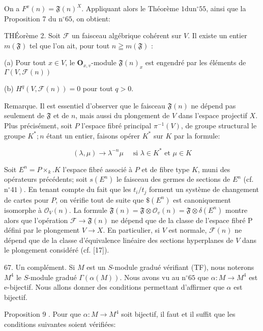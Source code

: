 On a $F^{x}(n)=\mathfrak{F}(n)^{X}$. Appliquant alors le Théorème $1 \mathrm{du} \mathrm{n}^{\circ} 55$, ainsi que la Proposition 7 du $\mathrm{n}^{\circ} 65$, on obtient:

THÉorème 2. Soit $\mathcal{F}$ un faisceau algébrique cohérent sur $V$. Il existe un entier $m(\mathfrak{F})$ tel que l'on ait, pour tout $n \geqq m(\mathfrak{F})$ :

(a) Pour tout $x \in V$, le $\boldsymbol{O}_{x, v}$-module $\mathfrak{F}(n)_{x}$ est engendré par les éléments de $\Gamma(V, \mathcal{F}(n))$

(b) $H^{q}(V, \mathcal{F}(n))=0$ pour tout $q>0$.

Remarque. Il est essentiel d'observer que le faisceau $\mathfrak{F}(n)$ ne dépend pas seulement de $\mathfrak{F}$ et de $n$, mais aussi du plongement de $V$ dans l'espace projectif $X$. Plus précisément, soit $P$ l'espace fibré principal $\pi^{-1}(V)$, de groupe structural le groupe $K^{*} ; n$ étant un entier, faisons opérer $K^{*}$ sur $K$ par la formule:

$$
(\lambda, \mu) \rightarrow \lambda^{-n} \mu \quad \text { si } \lambda \in K^{*} \text { et } \mu \in K
$$

Soit $E^{n}=P \times_{k} . K$ l'espace fibré associé à $P$ et de fibre type $K$, muni des opérateurs précédents; soit $s\left(E^{n}\right)$ le faisceau des germes de sections de $E^{n}$ (cf. $\left.\mathrm{n}^{\circ} 41\right)$. En tenant compte du fait que les $t_{i} / t_{j}$ forment un système de changement de cartes pour $P$, on vérifie tout de suite que $\$\left(E^{n}\right)$ est canoniquement isomorphe à $\mathcal{O}_{V}(n) .$ La formule $\mathfrak{F}(n)=\mathfrak{F} \otimes \mathcal{O}_{v}(n)=\mathfrak{F} \otimes \delta\left(E^{n}\right)$ montre alors que l'opération $\mathcal{F} \rightarrow \mathfrak{F}(n)$ ne dépend que de la classe de l'espace fibré P défini par le plongement $V \rightarrow X .$ En particulier, si $V$ est normale, $\mathscr{F}(n)$ ne dépend que de la classe d'équivalence linéaire des sections hyperplanes de $V$ dans le plongement considéré (cf. [17]).

67. Un complément. Si $M$ est un $S$-module gradué vérifiant (TF), nous noterons $M^{4}$ le $S$-module gradué $\Gamma(\alpha(M))$. Nous avons vu au $\mathrm{n}^{\circ} 65$ que $\alpha: M \rightarrow M^{4}$ est e-bijectif. Nous allons donner des conditions permettant d'affirmer que $\alpha$ est bijectif.

Proposition 9 . Pour que $\alpha: M \rightarrow M^{4}$ soit bijectif, il faut et il suffit que les conditions suivantes soient vérifiées:

